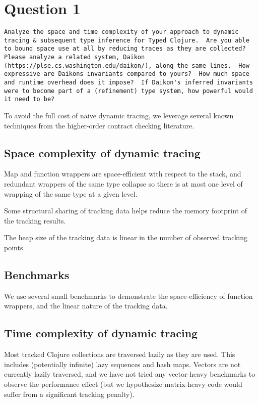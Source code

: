 \section{Question 1}

\begin{verbatim}
Analyze the space and time complexity of your approach to dynamic
tracing & subsequent type inference for Typed Clojure.  Are you able
to bound space use at all by reducing traces as they are collected?
Please analyze a related system, Daikon
(https://plse.cs.washington.edu/daikon/), along the same lines.  How
expressive are Daikons invariants compared to yours?  How much space
and runtime overhead does it impose?  If Daikon's inferred invariants
were to become part of a (refinement) type system, how powerful would
it need to be?
\end{verbatim}

\pagebreak

To avoid the full cost of naive dynamic tracing, we leverage several
known techniques from the higher-order contract checking literature.

\subsection{Space complexity of dynamic tracing}

Map and function wrappers are space-efficient with respect to the stack, and
redundant wrappers of the same type collapse so there is at most one level
of wrapping of the same type at a given level.

Some structural sharing of tracking data helps reduce the memory footprint
of the tracking results.

The heap size of the tracking data is linear in the number of observed
tracking points.

\subsection{Benchmarks}

We use several small benchmarks to demonstrate the space-efficiency of
function wrappers, and the linear nature of the tracking data.

\subsection{Time complexity of dynamic tracing}

Most tracked Clojure collections are traversed lazily as they are used.
This includes (potentially infinite) lazy sequences and hash maps.
Vectors are not currently lazily traversed, and we have not tried any vector-heavy
benchmarks to observe the performance effect (but we hypothesize matrix-heavy
code would suffer from a significant tracking penalty).

